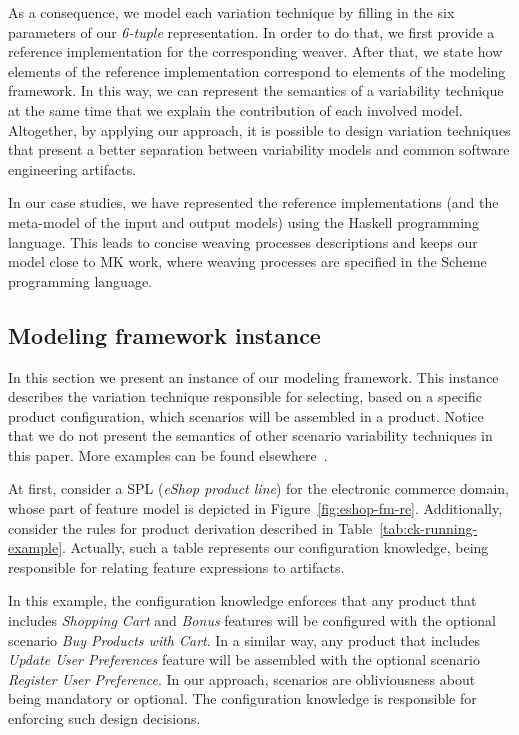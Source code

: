 \documentclass[times, 11pt,twocolumn]{article}
\begin{document}
As a consequence, we model each variation technique by filling in
the six parameters of our \emph{6-tuple} representation. In order to do
that, we first provide a reference implementation for the corresponding
weaver. After that, we state how elements of the reference implementation
correspond to elements of the modeling framework. In this way, we can represent the semantics
of a variability technique at the same time that we explain the contribution of each involved model. 
Altogether, by applying our approach, it is possible to design variation
techniques that present a better separation between variability models and
common software engineering artifacts.

In our case studies, we have represented the reference implementations (and the
meta-model of the input and output models) using the Haskell programming language. 
This leads to concise weaving processes descriptions and keeps our model close
to MK work, where weaving processes are specified in the Scheme programming language. 

\subsection{Modeling framework instance}\label{sub:framework-instance}

In this section we present an instance of our modeling framework. This
instance describes the variation technique responsible for selecting, based on a specific product
configuration, which scenarios will be assembled in a product.
Notice that we do not present the semantics of other scenario
variability techniques in this paper. More examples can be found
elsewhere~\cite{Bonifacio:2008ab}.

At first, consider a SPL (\emph{eShop product line}) for the electronic
commerce domain, whose part of feature model is depicted in
Figure~\ref{fig:eshop-fm-re}. Additionally, consider the rules for product
derivation described in Table~\ref{tab:ck-running-example}. Actually, such a table
represents our configuration knowledge, being responsible for relating feature
expressions to artifacts. 

In this example, the configuration knowledge
enforces that any product that includes \emph{Shopping Cart} and
\emph{Bonus} features will be configured with the optional scenario \emph{Buy
Products with Cart}. In a similar way, any product that includes \emph{Update
User Preferences} feature will be assembled with the optional scenario
\emph{Register User Preference}. In our approach, scenarios are obliviousness
about being mandatory or optional. The configuration knowledge is
responsible for enforcing such design decisions.
\end{document}
